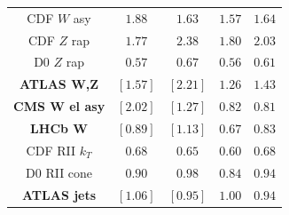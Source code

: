 \documentclass[10pt]{beamer}
\begin{document}
\begin{frame}
\begin{columns}
\begin{column}{0.6\textwidth}
\begin{table}
\begin{tabular}{|c||c|c||c|c|}
 \hline
CDF $W$ asy         & $          1.88      $ & $          1.63      $  &  $          1.57      $  &  $          1.64      $   \\  
CDF $Z$ rap         & $          1.77      $ & $          2.38      $  &  $          1.80      $  &  $          2.03      $    \\  
D0 $Z$ rap          & $          0.57      $ & $          0.67      $  &  $          0.56      $  &  $          0.61      $   \\  
\textbf{ATLAS W,Z}         & $  \left[     1.57 \right]  $ & $  \left[     2.21 \right]   $  &  $          1.26      $  &  $          1.43      $   \\  
\textbf{CMS W el asy}      & $  \left[     2.02 \right]   $ & $  \left[     1.27 \right]   $  &  $          0.82      $  &  $          0.81      $    \\  
\textbf{LHCb W}            & $  \left[    0.89 \right]   $ & $  \left[     1.13 \right]   $  &  $          0.67      $  &  $          0.83      $    \\  
 \hline
CDF RII $k_T$       & $          0.68      $ & $          0.65      $  &  $          0.60      $  &  $          0.68      $   \\  
D0 RII cone         & $          0.90      $ & $          0.98      $  &  $          0.84      $  &  $          0.94      $    \\  
\textbf{ATLAS jets}          & $  \left[     1.06 \right]   $ & $  \left[     0.95 \right]   $  &  $          1.00      $  &  $          0.94      $  \\

\hline
\end{tabular}
\end{table}
\end{column}
\end{columns}

\end{frame}
\end{document}
